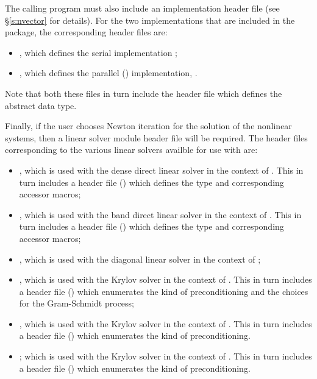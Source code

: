 The calling program must also include an {\nvector} implementation header file
(see \S\ref{s:nvector} for details).
For the two {\nvector} implementations that are included in the {\cvodes} package,
the corresponding header files are:
\begin{itemize}
\item {}, 
  which defines the serial implementation {\nvecs};
\item {}, 
  which defines the parallel ({\mpi}) implementation, {\nvecp}.
\end{itemize}
Note that both these files in turn include the header file  which 
defines the abstract  data type. 

Finally, if the user chooses Newton iteration for the solution of the nonlinear
systems, then a linear solver module header file will be required. 
The header files corresponding to the various linear solvers availble for use
with {\cvodes} are:
\begin{itemize}
\item {}, 
  which is used with the dense direct linear solver in 
  the context of {\cvodes}. This in turn includes a header file ()
  which defines the  type and corresponding accessor macros; 
\item {}, 
  which is used with the band direct linear solver in the
  context of {\cvodes}. This in turn includes a header file ()
  which defines the  type and corresponding accessor macros;
\item {}, which is used with the diagonal linear solver in the
  context of {\cvodes};
\item {}, 
  which is used with the Krylov solver {\spgmr} in the
  context of {\cvodes}. This in turn includes a header file ()
  which enumerates the kind of preconditioning and the choices for the
  Gram-Schmidt process;
\item {}, 
  which is used with the Krylov solver {\spbcg} in the
  context of {\cvodes}. This in turn includes a header file ()
  which enumerates the kind of preconditioning.
\item {}; 
  which is used with the Krylov solver {\sptfqmr} in the
  context of {\cvodes}. This in turn includes a header file ()
  which enumerates the kind of preconditioning.
\end{itemize}

